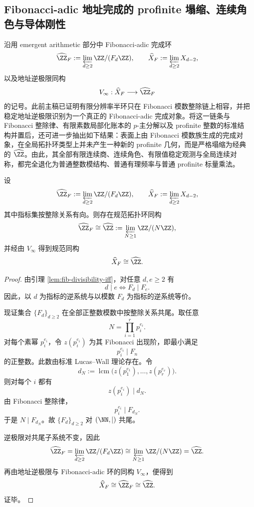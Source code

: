 \subsection{Fibonacci-adic 地址完成的 profinite 塌缩、连续角色与导体刚性}\label{subsec:conclusion-fibadic-profinite-collapse-character-conductor-rigidity}
沿用 emergent arithmetic 部分中 Fibonacci-adic 完成环
\[
\widehat{\ZZ}_F:=\varprojlim_{d\ge 2}\ZZ/(F_d\ZZ),
\qquad
\widehat X_F:=\varprojlim_{d\ge 2}X_{d-2},
\]
以及地址逆极限同构
\[
V_\infty:\widehat X_F\longrightarrow \widehat{\ZZ}_F
\]
的记号。此前主稿已证明有限分辨率半环只在 Fibonacci 模数整除链上相容，并把稳定地址逆极限识别为一个真正的 Fibonacci-adic 完成对象。将这一链条与 Fibonacci 整除律、有限素数局部化账本的 \(p\)-主分解以及 profinite 整数的标准结构并置后，还可进一步抽出如下结果：表面上由 Fibonacci 模数族生成的完成对象，在全局拓扑环类型上并未产生一种新的 profinite 几何，而是严格塌缩为经典的 \(\widehat{\ZZ}\)。由此，其全部有限连续商、连续角色、有限值稳定观测与全局连续对称，都完全退化为普通整数模结构、普通有理频率与普通 profinite 标量乘法。

\begin{theorem}\label{thm:conclusion-fibadic-profinite-collapse-to-zhat}
设
\[
\widehat{\ZZ}_F:=\varprojlim_{d\ge 2}\ZZ/(F_d\ZZ),
\qquad
\widehat X_F:=\varprojlim_{d\ge 2}X_{d-2},
\]
其中指标集按整除关系有向。则存在规范拓扑环同构
\[
\widehat{\ZZ}_F\cong \widehat{\ZZ}:=\varprojlim_{N\ge 1}\ZZ/(N\ZZ),
\]
并经由 \(V_\infty\) 得到规范同构
\[
\widehat X_F\cong \widehat{\ZZ}.
\]
\end{theorem}
\begin{proof}
由引理 \ref{lem:fib-divisibility-iff}，对任意 \(d,e\ge 2\) 有
\[
d\mid e \iff F_d\mid F_e.
\]
因此，以 \(d\) 为指标的逆系统与以模数 \(F_d\) 为指标的逆系统等价。

现证集合 \(\{F_d\}_{d\ge 2}\) 在全部正整数模数中按整除关系共尾。取任意
\[
N=\prod_{i=1}^r p_i^{e_i}.
\]
对每个素幂 \(p_i^{e_i}\)，令 \(z(p_i^{e_i})\) 为其 Fibonacci 出现阶，即最小满足
\[
p_i^{e_i}\mid F_n
\]
的正整数。此数由标准 Lucas--Wall 理论存在。令
\[
d_N:=\operatorname{lcm}\bigl(z(p_1^{e_1}),\dots,z(p_r^{e_r})\bigr).
\]
则对每个 \(i\) 都有
\[
z(p_i^{e_i})\mid d_N.
\]
由 Fibonacci 整除律，
\[
p_i^{e_i}\mid F_{d_N}.
\]
于是 \(N\mid F_{d_N}\)。故 \(\{F_d\}_{d\ge 2}\) 对 \((\NN,\mid)\) 共尾。

逆极限对共尾子系统不变，因此
\[
\widehat{\ZZ}_F
=
\varprojlim_{d\ge 2}\ZZ/(F_d\ZZ)
\cong
\varprojlim_{N\ge 1}\ZZ/(N\ZZ)
=
\widehat{\ZZ}.
\]
再由地址逆极限与 Fibonacci-adic 环的同构 \(V_\infty\)，便得到
\[
\widehat X_F\cong \widehat{\ZZ}_F\cong \widehat{\ZZ}.
\]
证毕。
\end{proof}

